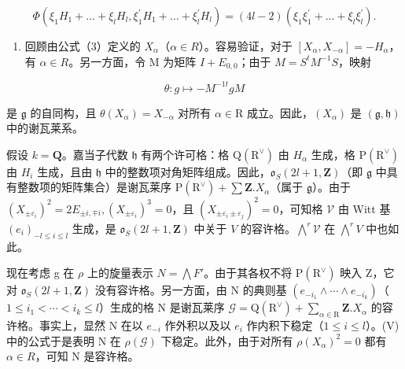 \[
\varPhi (\xi_ {1} H _ {1} + \dots + \xi_ {l} H _ {l}, \xi_ {1} ^ {\prime} H _ {1} + \dots + \xi_ {l} ^ {\prime} H _ {l}) = (4 l - 2) (\xi_ {1} \xi_ {1} ^ {\prime} + \dots + \xi_ {l} \xi_ {l} ^ {\prime}).
\]

\begin{enumerate}
\def\labelenumi{(\Roman{enumi})}
\setcounter{enumi}{8}
\tightlist
\item
回顾由公式（3）定义的 \(X_{\alpha}\)（\(\alpha \in R\)）。容易验证，对于 \([X_{\alpha}, X_{-\alpha}] = -H_{\alpha}\)，有 \(\alpha \in R\)。另一方面，令 M 为矩阵 \(I + E_{0,0}\)；由于 \(M = S^{t}M^{-1}S\)，映射
\end{enumerate}

\[
\theta : g \mapsto - M ^ {- 1 t} g M
\]

是 \(\mathfrak{g}\) 的自同构，且 \(\theta(X_{\alpha}) = X_{-\alpha}\) 对所有 \(\alpha \in \mathrm{R}\) 成立。因此，\((X_{\alpha})\) 是 \((\mathfrak{g},\mathfrak{h})\) 中的谢瓦莱系。

假设 \(k = \mathbf{Q}\)。嘉当子代数 \(\mathfrak{h}\) 有两个许可格：格 \(\mathrm{Q}(\mathrm{R}^{\vee})\) 由 \(H_{\alpha}\) 生成，格 \(\mathrm{P}(\mathrm{R}^{\vee})\) 由 \(H_{i}\) 生成，且由 \(\mathfrak{h}\) 中的整数项对角矩阵组成。因此，\(\mathfrak{o}_S(2l + 1, \mathbf{Z})\)（即 \(\mathfrak{g}\) 中具有整数项的矩阵集合）是谢瓦莱序 \(\mathrm{P}(\mathrm{R}^{\vee}) + \sum \mathbf{Z}.X_{\alpha}\)（属于 \(\mathfrak{g}\)）。由于 \((X_{\pm \varepsilon_i})^2 = 2E_{\pm i,\mp i}, (X_{\pm \varepsilon_i})^3 = 0\)，且 \((X_{\pm \varepsilon_i\pm \varepsilon_j})^2 = 0\)，可知格 \(\mathcal{V}\) 由 Witt 基 \((e_i)_{-l\leq i\leq l}\) 生成，是 \(\mathfrak{o}_S(2l + 1,\mathbf{Z})\) 中关于 \(V\) 的容许格。\(\bigwedge^r\mathcal{V}\) 在 \(\bigwedge^r V\) 中也如此。

现在考虑 g 在 \(\rho\) 上的旋量表示 \(N = \bigwedge F'\)。由于其各权不将 \(\mathrm{P}(\mathrm{R}^{\vee})\) 映入 Z，它对 \(\mathfrak{o}_{S}(2l + 1, \mathbf{Z})\) 没有容许格。另一方面，由 N 的典则基 \((e_{-i_{1}} \wedge \cdots \wedge e_{-i_{k}})\)（\(1 \leq i_{1} < \cdots < i_{k} \leq l\)）生成的格 N 是谢瓦莱序 \(\mathcal{G} = \mathrm{Q}(\mathrm{R}^{\vee}) + \sum_{\alpha \in \mathrm{R}} \mathbf{Z}. X_{\alpha}\) 的容许格。事实上，显然 N 在以 \(e_{-i}\) 作外积以及以 \(e_{i}\) 作内积下稳定（\(1 \leq i \leq l\)）。(V) 中的公式于是表明 N 在 \(\rho(\mathcal{G})\) 下稳定。此外，由于对所有 \(\rho(X_{\alpha})^{2} = 0\) 都有 \(\alpha \in R\)，可知 N 是容许格。

